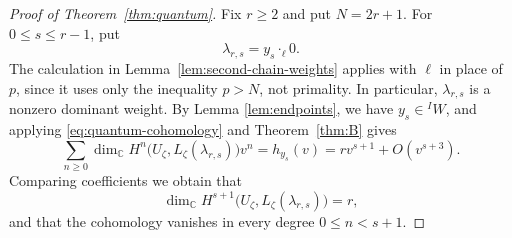 \documentclass[11pt,a4paper,reqno]{amsart}
\numberwithin{equation}{section}
\theoremstyle{definition}
\theoremstyle{remark}
\theoremstyle{plain}
\begin{document}
\begin{proof}[Proof of Theorem~\ref{thm:quantum}]
Fix $r\geq2$ and put $N=2r+1$.
For $0\leq s\leq r-1$, put
\[
\lambda_{r,s}=y_s\cdot_\ell0.
\]
The calculation in Lemma~\ref{lem:second-chain-weights}
applies with $\ell$ in place of $p$, since it uses only
the inequality $p>N$, not primality.
In particular, $\lambda_{r,s}$ is a nonzero dominant
weight. By Lemma \ref{lem:endpoints}, we have $y_s\in{}^IW$, and applying \eqref{eq:quantum-cohomology} and
Theorem~\ref{thm:B} gives
\[\textstyle 
\sum_{n\geq0}
\dim_{\mathbb C}H^n
\bigl(U_\zeta,L_\zeta(\lambda_{r,s})\bigr)v^n
=h_{y_s}(v)
=rv^{s+1}+O(v^{s+3}).
\]
Comparing coefficients we obtain that
\[
\dim_{\mathbb C}H^{s+1}
\bigl(U_\zeta,L_\zeta(\lambda_{r,s})\bigr)=r,
\]
and that the cohomology vanishes in every degree
$0\leq n<s+1$.
\end{proof}
\end{document}
